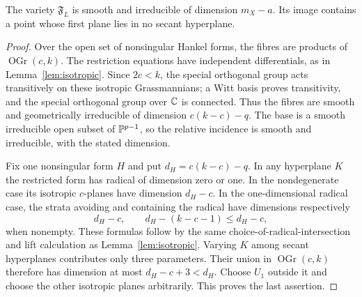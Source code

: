 \begin{lemma}\label{lem:nondegenerate-incidence}
The variety $\mathfrak F_L$ is smooth and irreducible of dimension $m_X-a$. Its image contains a point whose first plane lies in no secant hyperplane.
\end{lemma}
\begin{proof}
Over the open set of nonsingular Hankel forms, the fibres are products of $\operatorname{OGr}(c,k)$. The restriction equations have independent differentials, as in Lemma~\ref{lem:isotropic}. Since $2c<k$, the special orthogonal group acts transitively on these isotropic Grassmannians; a Witt basis proves transitivity, and the special orthogonal group over $\mathbb C$ is connected. Thus the fibres are smooth and geometrically irreducible of dimension $c(k-c)-q$. The base is a smooth irreducible open subset of $\mathbb P^{p-1}$, so the relative incidence is smooth and irreducible, with the stated dimension.

Fix one nonsingular form $H$ and put $d_H=c(k-c)-q$. In any hyperplane $K$ the restricted form has radical of dimension zero or one. In the nondegenerate case its isotropic $c$-planes have dimension $d_H-c$. In the one-dimensional radical case, the strata avoiding and containing the radical have dimensions respectively
\[
 d_H-c,\qquad d_H-(k-c-1)\le d_H-c,
\]
when nonempty. These formulas follow by the same choice-of-radical-intersection and lift calculation as Lemma~\ref{lem:isotropic}. Varying $K$ among secant hyperplanes contributes only three parameters. Their union in $\operatorname{OGr}(c,k)$ therefore has dimension at most $d_H-c+3<d_H$. Choose $U_1$ outside it and choose the other isotropic planes arbitrarily. This proves the last assertion.
\end{proof}

